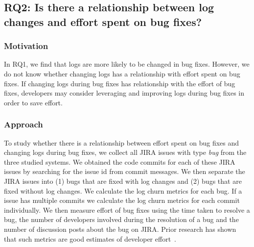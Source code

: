 \subsection*{RQ2: Is there a relationship between log changes and effort spent on bug fixes?}


\subsubsection*{Motivation}

In RQ1, we find that logs are more likely to be changed in bug fixes. However, we do not know whether changing logs has a relationship with effort spent on bug fixes. If changing logs during bug fixes has relationship with the effort of bug fixes, developers may consider leveraging and improving logs during bug fixes in order to save effort.

\subsubsection*{Approach}



To study whether there is a relationship between effort spent on bug fixes and changing logs during bug fixes, we collect all JIRA issues with type \emph{bug} from the three studied systems. We obtained the code commits for each of these JIRA issues by searching for the issue id from commit messages. We then separate the JIRA issues into (1) bugs that are fixed with log changes and (2) bugs that are fixed without log changes. We calculate the log churn metrics for each bug. If a issue has multiple commits we calculate the log churn metrics for each commit individually. We then measure effort of bug fixes using the time taken to resolve a bug, the number of developers involved during the resolution of a bug and the number of discussion posts about the bug on JIRA. Prior research has shown that such metrics are good estimates of developer effort~\cite{amor2006effort}. 

